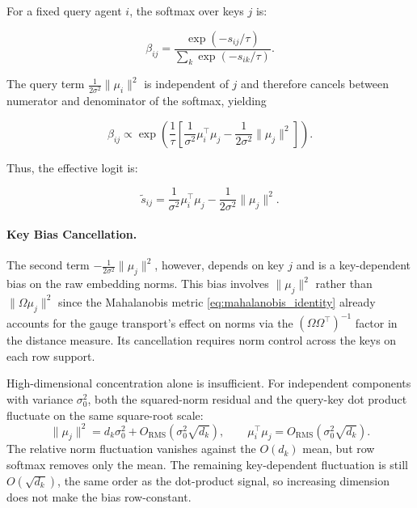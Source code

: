 \documentclass[twoside,11pt]{article}
\begin{document}
For a fixed query agent $i$, the softmax over keys $j$ is:

\begin{equation}
\beta_{ij} = \frac{\exp(-s_{ij}/\tau)}{\sum_k \exp(-s_{ik}/\tau)}.
\end{equation}

The query term $\frac{1}{2\sigma^2}\|\mu_i\|^2$ is independent of $j$ and therefore cancels between numerator and denominator of the softmax, yielding

\begin{equation}
\beta_{ij} \propto \exp\left(\frac{1}{\tau}\left[\frac{1}{\sigma^2}\mu_i^\top\mu_j - \frac{1}{2\sigma^2}\|\mu_j\|^2\right]\right).
\end{equation}

Thus, the effective logit is:

\begin{equation}
\tilde{s}_{ij} = \frac{1}{\sigma^2}\mu_i^\top\mu_j - \frac{1}{2\sigma^2}\|\mu_j\|^2.
\end{equation}

\paragraph{Key Bias Cancellation.}

The second term $-\frac{1}{2\sigma^2}\|\mu_j\|^2$, however, depends on key $j$ and is a key-dependent bias on the raw embedding norms. This bias involves $\|\mu_j\|^2$ rather than $\|\Omega\mu_j\|^2$ since the Mahalanobis metric \eqref{eq:mahalanobis_identity} already accounts for the gauge transport's effect on norms via the $(\Omega\Omega^\top)^{-1}$ factor in the distance measure. Its cancellation requires norm control across the keys on each row support.

High-dimensional concentration alone is insufficient. For independent components with variance $\sigma_0^2$, both the squared-norm residual and the query-key dot product fluctuate on the same square-root scale:
\begin{equation}
\|\mu_j\|^2=d_k\sigma_0^2+O_{\mathrm{RMS}}(\sigma_0^2\sqrt{d_k}),
\qquad
\mu_i^\top\mu_j=O_{\mathrm{RMS}}(\sigma_0^2\sqrt{d_k}).
\label{eq:key_norm_dot_fluctuation_scales}
\end{equation}
The relative norm fluctuation vanishes against the $O(d_k)$ mean, but row softmax removes only the mean. The remaining key-dependent fluctuation is still $O(\sqrt{d_k})$, the same order as the dot-product signal, so increasing dimension does not make the bias row-constant.
\end{document}
